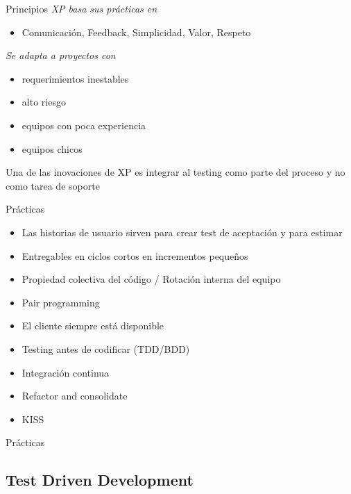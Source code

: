 \documentclass{beamer}
\begin{document}
\begin{frame}{Principios}
\textit{XP basa sus pr\'acticas en}
\begin{itemize}
        \item Comunicaci\'on, Feedback, Simplicidad, Valor, Respeto
\end{itemize}
\textit{Se adapta a proyectos con}
\begin{itemize}
        \item requerimientos inestables
        \item alto riesgo
        \item equipos con poca experiencia
        \item equipos chicos
\end{itemize}
Una de las inovaciones de XP es integrar al testing como parte del proceso y no como tarea de soporte
\end{frame}

\begin{frame}{Pr\'acticas}
\begin{itemize}
        \item Las historias de usuario sirven para crear test de aceptaci\'on y para estimar
        \item Entregables en ciclos cortos en incrementos peque\~nos
        \item Propiedad colectiva del c\'odigo / Rotaci\'on interna del equipo
        \item Pair programming
        \item El cliente siempre est\'a disponible
        \item Testing antes de codificar (TDD/BDD)
        \item Integraci\'on continua
        \item Refactor and consolidate
        \item KISS
\end{itemize}
\end{frame}

\begin{frame}{Pr\'acticas}
\begin{center}
\end{center}
\end{frame}
  

\subsection{Test Driven Development}
\end{document}
